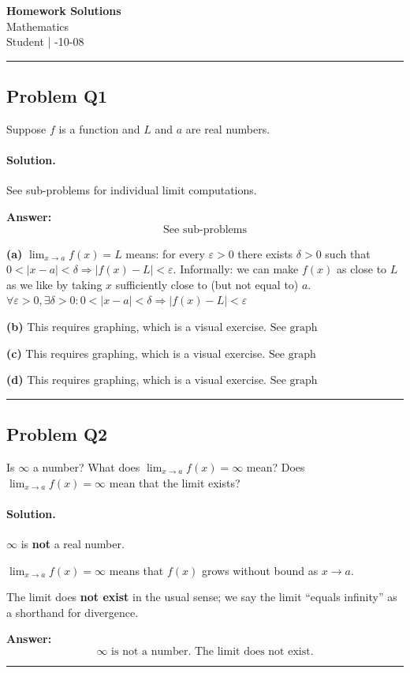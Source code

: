 \documentclass[12pt, a4paper]{article}
\newcommand{\problem}[1]{\subsection*{Problem #1}}
\newcommand{\solution}{\paragraph{Solution.}}
\begin{document}
\begin{center}
    {\LARGE\bfseries Homework Solutions} \\[0.5em]
    {\large Mathematics} \\[0.3em]
    Student \quad | -10-08
\end{center}

\hrule
\vspace{1em}
\problem{Q1}

Suppose $f$ is a function and $L$ and $a$ are real numbers.

\solution

See sub-problems for individual limit computations.

\textbf{Answer:}
\[\boxed{\text{See sub-problems}}\]

\textbf{(a)}
$\lim_{x \to a} f(x) = L$ means: for every $\varepsilon > 0$ there exists $\delta > 0$ such that
$0 < |x - a| < \delta \Rightarrow |f(x) - L| < \varepsilon$.
Informally: we can make $f(x)$ as close to $L$ as we like by taking $x$ sufficiently close to (but not equal to) $a$.
$\boxed{\forall \varepsilon > 0, \exists \delta > 0: 0 < |x-a| < \delta \Rightarrow |f(x)-L| < \varepsilon}$

\textbf{(b)}
This requires graphing, which is a visual exercise.
$\boxed{\text{See graph}}$

\textbf{(c)}
This requires graphing, which is a visual exercise.
$\boxed{\text{See graph}}$

\textbf{(d)}
This requires graphing, which is a visual exercise.
$\boxed{\text{See graph}}$

\vspace{1em}
\hrule
\vspace{1em}

\problem{Q2}

Is $\infty$ a number? What does $\lim_{x \to a} f(x) = \infty$ mean? Does $\lim_{x \to a} f(x) = \infty$ mean that the limit exists?

\solution

$\infty$ is \textbf{not} a real number.

$\lim_{x \to a} f(x) = \infty$ means that $f(x)$ grows without bound as $x \to a$.

The limit does \textbf{not exist} in the usual sense; we say the limit ``equals infinity'' as a shorthand for divergence.

\textbf{Answer:}
\[\boxed{\infty \text{ is not a number. The limit does not exist.}}\]

\vspace{1em}
\hrule
\vspace{1em}
\end{document}
